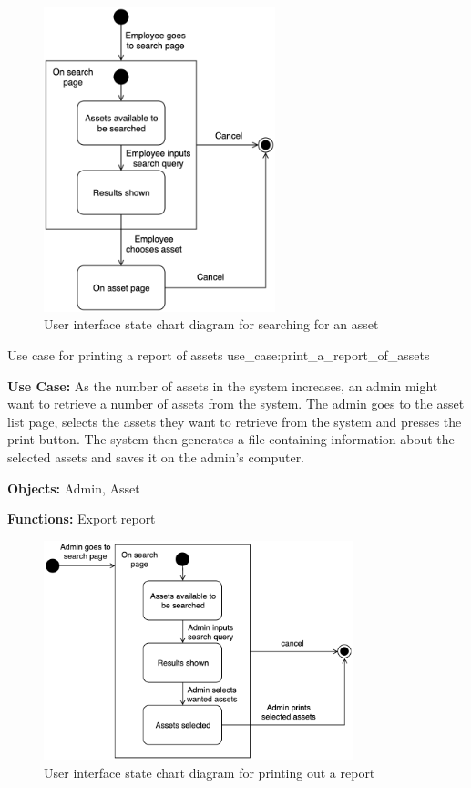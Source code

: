 \begin{figure}[H]
    \centering
    \includegraphics[width=0.6\textwidth]{figures/UseCases/UC_Search_asset.png}
    \caption{User interface state chart diagram for searching for an asset}
    \label{fig:search_asset_statechart}
\end{figure}

    {Use case for printing a report of assets}
    {use_case:print_a_report_of_assets}
    {
        \textbf{Use Case:} As the number of assets in the system increases, an admin might want to retrieve a number of assets from the system. The admin goes to the asset list page, selects the assets they want to retrieve from the system and presses the print button. The system then generates a file containing information about the selected assets and saves it on the admin's computer.
    
        \vskip 0.2cm
        
        \textbf{Objects:} Admin, Asset
        
        \vskip 0.2cm
        
        \textbf{Functions:} Export report
    }

\begin{figure}[H]
    \centering
    \includegraphics[width=0.8\textwidth]{figures/UseCases/UC_Print_report.png}
    \caption{User interface state chart diagram for printing out a report}
    \label{fig:print_report_statechart}
\end{figure}

